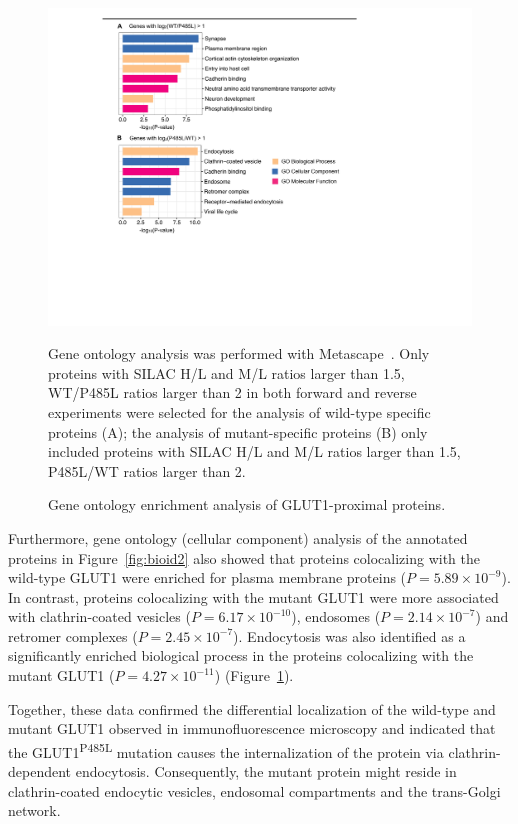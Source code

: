 \begin{figure}[h]
\centering
\includegraphics[scale=0.7]{Figures/GO}
\caption{Gene ontology enrichment analysis of GLUT1-proximal proteins.}
\vspace*{-3mm}
\small \justify
Gene ontology analysis was performed with Metascape~\cite{Tripathi}. Only proteins with SILAC H/L and M/L ratios larger than 1.5, WT/P485L ratios larger than 2 in both forward and reverse experiments were selected for the analysis of wild-type specific proteins (A); the analysis of mutant-specific proteins (B) only included proteins with SILAC H/L and M/L ratios larger than 1.5, P485L/WT ratios larger than 2.
\label{fig:go}
\end{figure}
Furthermore, gene ontology (cellular component) analysis of the annotated proteins in Figure~\ref{fig:bioid2} also showed that proteins colocalizing with the wild-type GLUT1 were enriched for plasma membrane proteins ($P=5.89\times 10^{-9}$). In contrast, proteins colocalizing with the mutant GLUT1 were more associated with clathrin-coated vesicles ($P=6.17\times 10^{-10}$), endosomes ($P=2.14\times 10^{-7}$) and retromer complexes ($P=2.45\times 10^{-7}$). Endocytosis was also identified as a significantly enriched biological process in the proteins colocalizing with the mutant GLUT1 ($P=4.27\times 10^{-11}$) (Figure~\ref{fig:go}).

Together, these data confirmed the differential localization of the wild-type and mutant GLUT1 observed in immunofluorescence microscopy and indicated that the GLUT1\textsuperscript{P485L} mutation causes the internalization of the protein via clathrin-dependent endocytosis. Consequently, the mutant protein might reside in clathrin-coated endocytic vesicles, endosomal compartments and the trans-Golgi network.
